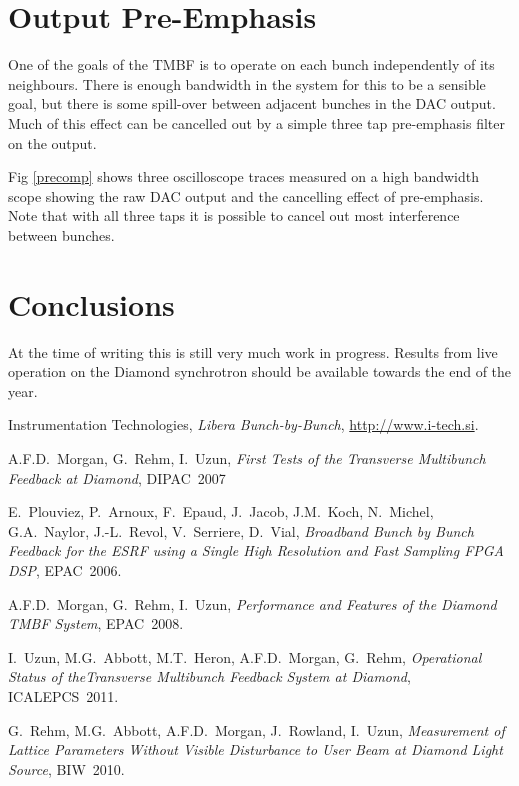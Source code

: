 \documentclass{JAC2003}
\begin{document}
\section{Output Pre-Emphasis}

One of the goals of the TMBF is to operate on each bunch independently of its
neighbours.  There is enough bandwidth in the system for this to be a sensible
goal, but there is some spill-over between adjacent bunches in the DAC output.
Much of this effect can be cancelled out by a simple three tap pre-emphasis
filter on the output.

Fig \ref{precomp} shows three oscilloscope traces measured on a high bandwidth
scope showing the raw DAC output and the cancelling effect of pre-emphasis.
Note that with all three taps it is possible to cancel out most interference
between bunches.



\section{Conclusions}

At the time of writing this is still very much work in progress.  Results from
live operation on the Diamond synchrotron should be available towards the end of
the year.



\begin{thebibliography}{9}

Instrumentation Technologies, \emph{Libera Bunch-by-Bunch},
\url{http://www.i-tech.si}.

A.F.D.~Morgan, G.~Rehm, I.~Uzun, \emph{First Tests of the Transverse Multibunch
Feedback at Diamond}, DIPAC~2007

E.~Plouviez, P.~Arnoux, F.~Epaud, J.~Jacob, J.M.~Koch, N.~Michel, G.A.~Naylor,
J.\mbox{-}L.~Revol, V.~Serriere, D.~Vial, \emph{Broadband Bunch by Bunch
Feedback for the ESRF using a Single High Resolution and Fast Sampling FPGA
DSP}, EPAC~2006.

A.F.D.~Morgan, G.~Rehm, I.~Uzun, \emph{Performance and Features of the Diamond
TMBF System}, EPAC~2008.

I.~Uzun, M.G.~Abbott, M.T.~Heron, A.F.D.~Morgan, G.~Rehm, \emph{Operational
Status of theTransverse Multibunch Feedback System at Diamond}, ICALEPCS~2011.

G.~Rehm, M.G.~Abbott, A.F.D.~Morgan, J.~Rowland, I.~Uzun, \emph{Measurement of
Lattice Parameters Without Visible Disturbance to User Beam at Diamond Light
Source}, BIW~2010.


\end{thebibliography}
\end{document}
